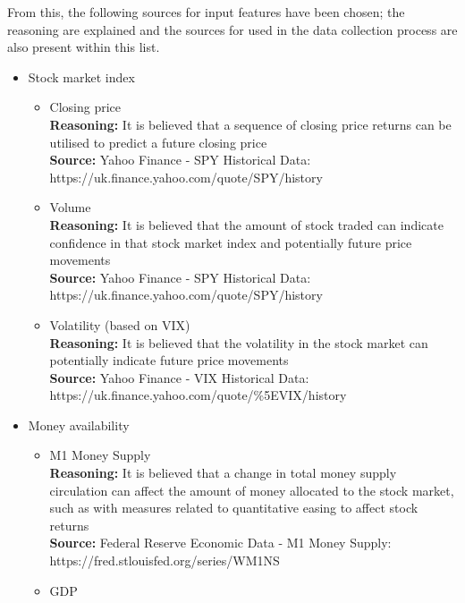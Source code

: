 From this, the following sources for input features have been chosen; the reasoning are explained and the
sources for used in the data collection process are also present within this list.
\begin{itemize}
    \item Stock market index
    \begin{itemize}
        \item Closing price\\
        \textbf{Reasoning:} It is believed that a sequence of closing price returns
        can be utilised to predict a future closing price\\
        \textbf{Source:} Yahoo Finance - SPY Historical Data:\\
        https://uk.finance.yahoo.com/quote/SPY/history
        \item Volume\\
        \textbf{Reasoning:} It is believed that the amount of stock traded can indicate
        confidence in that stock market index and potentially future price movements\\
        \textbf{Source:} Yahoo Finance - SPY Historical Data:\\
        https://uk.finance.yahoo.com/quote/SPY/history
        \item Volatility (based on VIX)\\
        \textbf{Reasoning:} It is believed that the volatility in the stock market can potentially
        indicate future price movements\\
        \textbf{Source:} Yahoo Finance - VIX Historical Data:\\
        https://uk.finance.yahoo.com/quote/\%5EVIX/history
    \end{itemize}
    \item Money availability
    \begin{itemize}
        \item M1 Money Supply\\
        \textbf{Reasoning:} It is believed that a change in total money supply circulation can affect
        the amount of money allocated to the stock market, such as with measures related to quantitative
        easing to affect stock returns\\
        \textbf{Source:} Federal Reserve Economic Data - M1 Money Supply:\\
        https://fred.stlouisfed.org/series/WM1NS
        \item GDP\\

\end{itemize}
\end{itemize}
